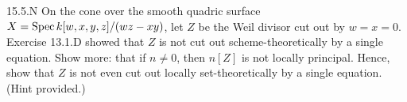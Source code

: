 \documentclass[12pt]{amsart}
\begin{document}
\begin{problem}{15.5.N}
    On the cone over the smooth quadric surface $X = \operatorname{Spec} k[w,x,y,z]/(wz-xy)$, let $Z$ be the Weil divisor cut out by $w = x = 0$. Exercise 13.1.D showed that $Z$ is not cut out scheme-theoretically by a single equation. Show more: that if $n \neq 0$, then $n[Z]$ is not locally principal. Hence, show that $Z$ is not even cut out locally set-theoretically by a single equation. (Hint provided.)
\end{problem}
\end{document}
